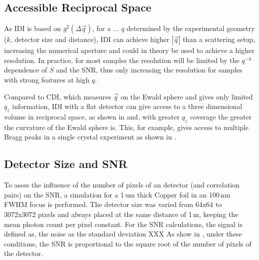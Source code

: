 \subsection{Accessible Reciprocal Space}

	As IDI is based on $g^2(\Delta \vec{q})$, for a ...  $q$ determined by the experimental geometry ($k$, detector size and distance), IDI can achieve higher $\left|\vec{q}\right|$ than a scattering setup, increasing the numerical aperture and could in theory be used to achieve a higher resolution. In practice, for most samples the resolution will be limited by the $q^{-4}$ dependence of $S$ and the SNR, thus only increasing the resolution for samples with strong features at high $q$.
	
	Compared to CDI, which measures $\vec{q}$ on the Ewald sphere and gives only limited $q_z$ information, IDI with a flat detector can give access  to a three dimensional volume in reciprocal space, as shown in  and, with greater $q_z$ coverage the greater the curvature of the Ewald sphere is. This, for example, gives access to multiple Bragg peaks in a single crystal experiment as shown in . 
		
	
\subsection{Detector Size and SNR}
	
	To asses the influence of the number of pixels of an detector (and correlation pairs) on the SNR, a simulation for a 1\,um thick Copper foil in an 100\,nm FWHM focus is performed. The detector size was varied from 64x64 to 3072x3072 pixels and always placed at the same distance of 1\,m, keeping the mean photon count per pixel constant. For the SNR calculations, the signal is defined as, the noise as the standard deviation XXX
	As show in , under these conditions, the SNR is proportional to the square root of the number of pixels of the detector.



